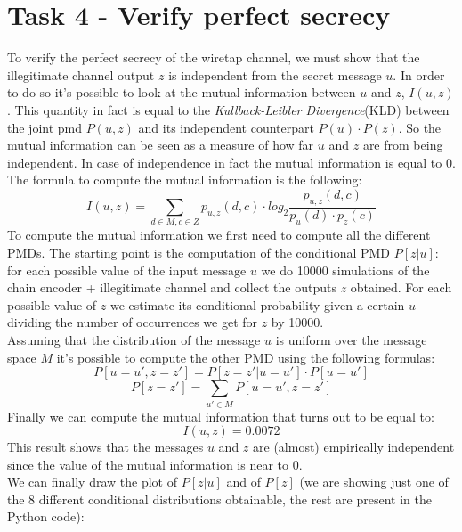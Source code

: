\documentclass{report}
\begin{document}
\section*{Task 4 - Verify perfect secrecy}
To verify the perfect secrecy of the wiretap channel, we must show that the illegitimate channel output $z$ is independent from the secret message $u$. In order to do so it’s possible to look at the mutual information between $u$ and $z$, $I(u,z)$. This quantity in fact is equal to the \textit{Kullback-Leibler Divergence}(KLD) between the joint pmd $P(u,z)$ and its independent counterpart $P(u)\cdot P(z)$. So the mutual information can be seen as a measure of how far $u$ and $z$ are from being independent. In case of independence in fact the mutual information is equal to 0.\\
The formula to compute the mutual information is the following: 
\begin{equation*}
I(u,z)=\sum_{d\in M, c\in Z}p_{u,z}(d,c)\cdot log_2\frac{p_{u,z}(d,c)}{p_u(d)\cdot p_z(c)}
\end{equation*}
To compute the mutual information we first need to compute all the different PMDs. The starting  point is the computation of the conditional PMD $P[z|u]$: for each possible value of the input  message $u$ we do 10000 simulations of the chain encoder + illegitimate channel and collect the outputs $z$ obtained. For each possible value of $z$ we estimate its conditional probability given a certain $u$ dividing the number of occurrences we get for $z$ by 10000.\\
Assuming that the distribution of the message $u$ is uniform over the message space $M$ it’s possible to compute the other PMD using the following formulas:
\begin{equation*}
P[u=u',z=z']=P[z=z'|u=u']\cdot P[u=u']
\end{equation*}
\begin{equation*}
P[z=z']=\sum_{u'\in M}P[u=u',z=z']
\end{equation*}
Finally we can compute the mutual information that turns out to be equal to:
\begin{equation*}
I(u,z)=0.0072
\end{equation*}
This result shows that the messages $u$ and $z$ are (almost) empirically independent since the value of the mutual information is near to 0.\\
We can finally draw the plot of $P[z|u]$ and of $P[z]$ (we are showing just one of the 8 different conditional distributions obtainable, the rest are present in the Python code): 
\end{document}
